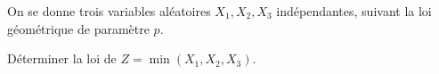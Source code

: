 \begin{enonce}
\begin{exercise}[ID={RMS135 E1497},subtitle={IMT MP 2024},tags={},difficulty={}]
On se donne trois variables aléatoires $X_1, X_2, X_3$ indépendantes, suivant la loi géométrique de paramètre $p$.

Déterminer la loi de $Z = \min(X_1, X_2, X_3)$.

\end{exercise}
\begin{solution}
\end{solution}
\end{enonce}
